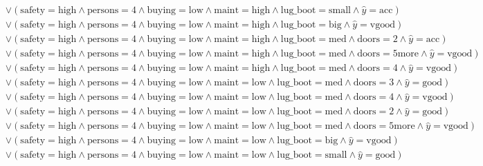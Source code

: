 \begin{scriptsize}
\[\begin{aligned}
  \\ & \lor (\text{safety}=\text{high} \land \text{persons}=\text{4} \land \text{buying}=\text{low} \land \text{maint}=\text{high} \land \text{lug_boot}=\text{small} \land \hat{y}=\text{acc})
  \\ & \lor (\text{safety}=\text{high} \land \text{persons}=\text{4} \land \text{buying}=\text{low} \land \text{maint}=\text{high} \land \text{lug_boot}=\text{big} \land \hat{y}=\text{vgood})
  \\ & \lor (\text{safety}=\text{high} \land \text{persons}=\text{4} \land \text{buying}=\text{low} \land \text{maint}=\text{high} \land \text{lug_boot}=\text{med} \land \text{doors}=\text{2} \land \hat{y}=\text{acc})
  \\ & \lor (\text{safety}=\text{high} \land \text{persons}=\text{4} \land \text{buying}=\text{low} \land \text{maint}=\text{high} \land \text{lug_boot}=\text{med} \land \text{doors}=\text{5more} \land \hat{y}=\text{vgood})
  \\ & \lor (\text{safety}=\text{high} \land \text{persons}=\text{4} \land \text{buying}=\text{low} \land \text{maint}=\text{high} \land \text{lug_boot}=\text{med} \land \text{doors}=\text{4} \land \hat{y}=\text{vgood})
  \\ & \lor (\text{safety}=\text{high} \land \text{persons}=\text{4} \land \text{buying}=\text{low} \land \text{maint}=\text{low} \land \text{lug_boot}=\text{med} \land \text{doors}=\text{3} \land \hat{y}=\text{good})
  \\ & \lor (\text{safety}=\text{high} \land \text{persons}=\text{4} \land \text{buying}=\text{low} \land \text{maint}=\text{low} \land \text{lug_boot}=\text{med} \land \text{doors}=\text{4} \land \hat{y}=\text{vgood})
  \\ & \lor (\text{safety}=\text{high} \land \text{persons}=\text{4} \land \text{buying}=\text{low} \land \text{maint}=\text{low} \land \text{lug_boot}=\text{med} \land \text{doors}=\text{2} \land \hat{y}=\text{good})
  \\ & \lor (\text{safety}=\text{high} \land \text{persons}=\text{4} \land \text{buying}=\text{low} \land \text{maint}=\text{low} \land \text{lug_boot}=\text{med} \land \text{doors}=\text{5more} \land \hat{y}=\text{vgood})
  \\ & \lor (\text{safety}=\text{high} \land \text{persons}=\text{4} \land \text{buying}=\text{low} \land \text{maint}=\text{low} \land \text{lug_boot}=\text{big} \land \hat{y}=\text{vgood})
  \\ & \lor (\text{safety}=\text{high} \land \text{persons}=\text{4} \land \text{buying}=\text{low} \land \text{maint}=\text{low} \land \text{lug_boot}=\text{small} \land \hat{y}=\text{good})

\end{aligned}\]
\end{scriptsize}

